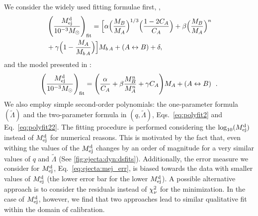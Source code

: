 We consider the widely used fitting formulae first, 
\citep{Kawaguchi:2016ana,Dietrich:2016fpt,Radice:2018pdn}, 
%
\begin{eqnarray}
\label{eq:fit_Mej}
&\left(\frac{M^{\text{d}}_{\text{ej}}}{10^{-3}M_{\odot}}\right)_{\rm fit} =
\Big[\alpha\Big(\frac{M_B}{M_A}\Big)^{1/3}\Big(\frac{1-2C_A}{C_A}\Big)+  
\beta\Big(\frac{M_B}{M_A}\Big)^n \\
&+ \gamma\Big(1-\frac{M_A}{M_{b\,A}} \Big)\Big]M_{b\,A} + (A\leftrightarrow B) + \delta\nonumber,
\end{eqnarray}
%
and the model presented in \citet{Kruger:2020gig}:
%
\begin{equation}
\label{eq:fit_Mej_Kruger}
\left(\frac{M^{\text{d}}_{\text{ej}}}{10^{-3}M_{\odot}}\right)_{\rm fit} =
\left(\frac{\alpha}{C_A} + \beta\frac{M_B ^n}{M_A ^n} + \gamma
C_A\Bigg)M_A + (A\leftrightarrow B)\right. \ .
\end{equation}
%
We also employ simple second-order polynomials: 
the one-parameter formula $(\tilde\Lambda)$ and the two-parameter
formula in $(q,\tilde\Lambda)$, 
Eqs.~\eqref{eq:polyfit2} and Eq.~\ref{eq:polyfit22}.  %
%
%
The fitting procedure is performed considering the $\log_{10}(M^{\text{d}}_{\text{ej}})$ instead of 
$M^{\text{d}}_{\text{ej}}$ for numerical reasons. This is motivated by the fact that, even withing 
\DSrefset{} the values of the $M^{\text{d}}_{\text{ej}}$ changes by an order of magnitude for a very 
similar values of $q$ and $\tilde{\Lambda}$ (See \ref{fig:ejecta:dyn:dsfits}).
%
Additionally, the error measure we consider for $M^{\text{d}}_{\text{ej}}$, Eq.~\eqref{eq:ejecta:mej_err}, 
is biased towards the data with smaller values of $M^{\text{d}}_{\text{ej}}$ (the lower error bar for the 
lower $M^{\text{d}}_{\text{ej}}$). A possible alternative approach is to consider the residuals instead of 
$\chi_{\nu}^2$ for the minimization. In the case of $M^{\text{d}}_{\text{ej}}$, however, we find that two 
approaches lead to similar qualitative fit within the domain of calibration.
%
